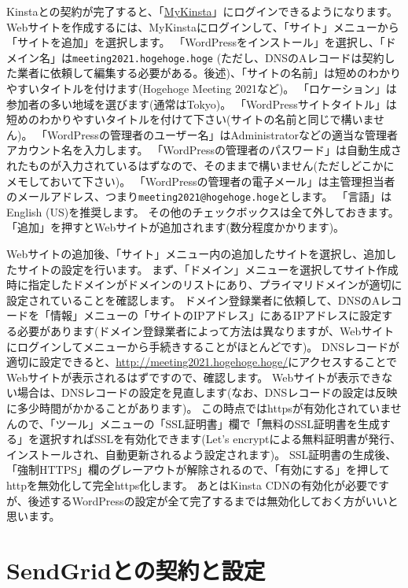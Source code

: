 \documentclass[titlepage,10pt,a4paper,uplatex]{jsbook}
\begin{document}
Kinstaとの契約が完了すると、「\href{https://my.kinsta.com/login/?lang=jp}{MyKinsta}」にログインできるようになります。
Webサイトを作成するには、MyKinstaにログインして、「サイト」メニューから「サイトを追加」を選択します。
「WordPressをインストール」を選択し、「ドメイン名」は\texttt{meeting2021.hogehoge.hoge} (ただし、DNSのAレコードは契約した業者に依頼して編集する必要がある。後述)、「サイトの名前」は短めのわかりやすいタイトルを付けます(Hogehoge Meeting 2021など)。
「ロケーション」は参加者の多い地域を選びます(通常はTokyo)。
「WordPressサイトタイトル」は短めのわかりやすいタイトルを付けて下さい(サイトの名前と同じで構いません)。
「WordPressの管理者のユーザー名」はAdministratorなどの適当な管理者アカウント名を入力します。
「WordPressの管理者のパスワード」は自動生成されたものが入力されているはずなので、そのままで構いません(ただしどこかにメモしておいて下さい)。
「WordPressの管理者の電子メール」は主管理担当者のメールアドレス、つまり\texttt{meeting2021@hogehoge.hoge}とします。
「言語」はEnglish (US)を推奨します。
その他のチェックボックスは全て外しておきます。
「追加」を押すとWebサイトが追加されます(数分程度かかります)。

Webサイトの追加後、「サイト」メニュー内の追加したサイトを選択し、追加したサイトの設定を行います。
まず、「ドメイン」メニューを選択してサイト作成時に指定したドメインがドメインのリストにあり、プライマリドメインが適切に設定されていることを確認します。
ドメイン登録業者に依頼して、DNSのAレコードを「情報」メニューの「サイトのIPアドレス」にあるIPアドレスに設定する必要があります(ドメイン登録業者によって方法は異なりますが、Webサイトにログインしてメニューから手続きすることがほとんどです)。
DNSレコードが適切に設定できると、\url{http://meeting2021.hogehoge.hoge/}にアクセスすることでWebサイトが表示されるはずですので、確認します。
Webサイトが表示できない場合は、DNSレコードの設定を見直します(なお、DNSレコードの設定は反映に多少時間がかかることがあります)。
この時点ではhttpsが有効化されていませんので、「ツール」メニューの「SSL証明書」欄で「無料のSSL証明書を生成する」を選択すればSSLを有効化できます(Let's encryptによる無料証明書が発行、インストールされ、自動更新されるよう設定されます)。
SSL証明書の生成後、「強制HTTPS」欄のグレーアウトが解除されるので、「有効にする」を押してhttpを無効化して完全https化します。
あとはKinsta CDNの有効化が必要ですが、後述するWordPressの設定が全て完了するまでは無効化しておく方がいいと思います。

\section{SendGridとの契約と設定}
\end{document}
